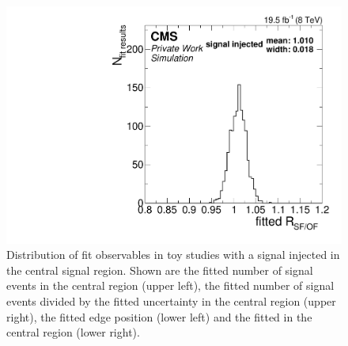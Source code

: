 \begin{figure}[hbp]
\begin{minipage}[t]{0.49\textwidth}
  \end{minipage}
  \begin{minipage}[t]{0.49\textwidth}
    \includegraphics[width=\textwidth]{plots/results/fit/toyResults/rSFOF_signalInjected.pdf}
  \end{minipage}
  \caption{Distribution of fit observables in toy studies with a signal injected in the central signal region. Shown are the fitted number of signal events in the central region (upper left), the fitted number of signal events divided by the fitted uncertainty in the central region (upper right), the fitted edge position (lower left) and the fitted \Rsfof in the central region (lower right).}
  \label{fig:toys:signalInjected}
\end{figure}


